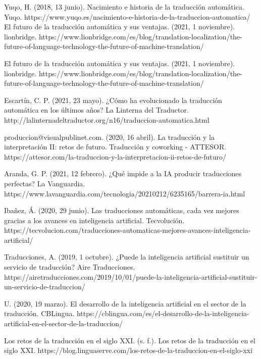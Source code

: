 \documentclass[a4paper]{article}
\theoremstyle{plain}
\theoremstyle{definition}
\begin{document}
    \begin{thebibliography}{0}
        \bibitem Yuqo, H. (2018, 13 junio). Nacimiento e historia de la traducción automática. Yuqo. https://www.yuqo.es/nacimiento-e-historia-de-la-traduccion-automatica/
        \bibitem El futuro de la traducción automática y sus ventajas. (2021, 1 noviembre). lionbridge. https://www.lionbridge.com/es/blog/translation-localization/the-future-of-language-technology-the-future-of-machine-translation/
        
       \bibitem El futuro de la traducción automática y sus ventajas. (2021, 1 noviembre). lionbridge. https://www.lionbridge.com/es/blog/translation-localization/the-future-of-language-technology-the-future-of-machine-translation/
       
       \bibitem  Escartín, C. P. (2021, 23 mayo). ¿Cómo ha evolucionado la traducción automática en los últimos años? La Linterna del Traductor. http://lalinternadeltraductor.org/n16/traduccion-automatica.html
       
       \bibitem produccion@visualpublinet.com. (2020, 16 abril). La traducción y la interpretación II: retos de futuro. Traducción y coworking - ATTESOR. https://attesor.com/la-traduccion-y-la-interpretacion-ii-retos-de-futuro/
       
       \bibitem Aranda, G. P. (2021, 12 febrero). ¿Qué impide a la IA producir traducciones perfectas? La Vanguardia. https://www.lavanguardia.com/tecnologia/20210212/6235165/barrera-ia.html
       
       
       \bibitem Ibañez, Á. (2020, 29 junio). Las traducciones automáticas, cada vez mejores gracias a los avances en inteligencia artificial. Tecvolución. https://tecvolucion.com/traducciones-automaticas-mejores-avances-inteligencia-artificial/
       
       \bibitem Traducciones, A. (2019, 1 octubre). ¿Puede la inteligencia artificial sustituir un servicio de traducción? Aire Traducciones. https://airetraducciones.com/2019/10/01/puede-la-inteligencia-artificial-sustituir-un-servicio-de-traduccion/
       
       \bibitem U. (2020, 19 marzo). El desarrollo de la inteligencia artificial en el sector de la traducción. CBLingua. https://cblingua.com/es/el-desarrollo-de-la-inteligencia-artificial-en-el-sector-de-la-traduccion/
       
       \bibitem Los retos de la traducción en el siglo XXI. (s. f.). Los retos de la traducción en el siglo XXI. https://blog.linguaserve.com/los-retos-de-la-traduccion-en-el-siglo-xxi
       
    \end{thebibliography}
    
\end{document}
